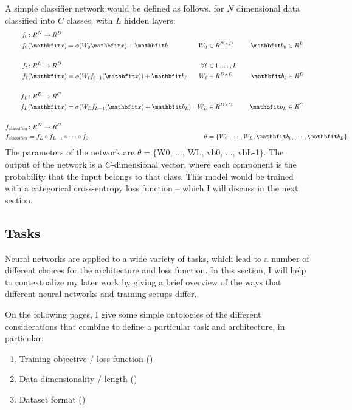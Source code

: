 A simple classifier network would be defined as follows, for $N$ dimensional data classified into $C$ classes, with $L$ hidden layers:
\begin{align}
\label{eqn:classifier}
\begin{aligned}
    \vfdef{f_0}{N}{D} \\
    f_{0}&(\x) = \phi(W_0 \x) + \vb &
    W_0 &\in \R^{N\times D} &
    \vb_0 &\in \R^{D}
\\ \\%
    \vfdef{f_\l}{D}{D} & \forall \l &\in 1,\dots,L \quad \\
    f_\l&(\x) = \phi(W_\l f_{\l-1}(\x)) + \vb_\l &
    W_\l &\in \R^{D\times D} \quad &
    \vb_\l &\in \R^{D}
\\ \\%
    \vfdef{f_L}{D}{C} \\
    f_{L}&(\x) = \sigma(W_L f_{L-1}(\x) + \vb_L) &
    W_L &\in \R^{D \times C} &
    \vb_L &\in \R^{C}
\\ \\%
    \vfdef{f_{\text{classifier}}}{N}{C} \\
    f_{\text{classifier}}& = f_L \circ f_{L-1} \circ \cdots \circ f_0 &
    \theta &= \rlap{\{$W_0, \cdots, W_L, \vb_0, \cdots, \vb_L \} $}
\end{aligned}
\end{align}
The parameters of the network are $\theta = \{$W0, ..., WL, vb0, ..., vbL-1$\}$. The output of the network is a $C$-dimensional vector, where each component is the probability that the input belongs to that class. This model would be trained with a categorical cross-entropy loss function -- which I will discuss in the next section.

\vspace{5cm}

\pagebreak

\subsection{Tasks}

Neural networks are applied to a wide variety of tasks, which lead to a number of different choices for the architecture and loss function. In this section, I will help to contextualize my later work by giving a brief overview of the ways that different neural networks and training setups differ.

On the following pages, I give some simple ontologies of the different considerations that combine to define a particular task and architecture, in particular:
\begin{enumerate}
    \item Training objective / loss function ()
    \item Data dimensionality / length ()
    \item Dataset format ()
\end{enumerate}


